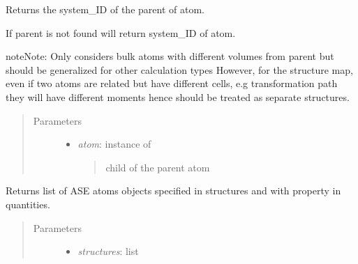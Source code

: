 \documentclass[letterpaper,10pt,english]{sphinxmanual}
\begin{document}
\begin{fulllineitems}

\begin{fulllineitems}
\label{classes:catdata.CATData.get_parent}
Returns the system\_ID of the parent of atom.

If parent is not found will return system\_ID of atom.

\begin{notice}{note}{Note:}
Only considers bulk atoms with different volumes from parent 
but should be generalized for other calculation types
However, for the structure map, even if two atoms are related
but have different cells, e.g transformation path they will
have different moments hence should be treated as separate
structures.
\end{notice}
\begin{quote}\begin{description}
\item[{Parameters}] \leavevmode\begin{itemize}
\item {} 
\emph{atom}: instance of 
\begin{quote}

child of the parent atom
\end{quote}

\end{itemize}

\end{description}\end{quote}

\end{fulllineitems}


\begin{fulllineitems}
\label{classes:catdata.CATData.get_ref_atoms}
Returns list of ASE atoms objects specified in structures and with
property in quantities.
\begin{quote}\begin{description}
\item[{Parameters}] \leavevmode\begin{itemize}
\item {} 
\emph{structures}: list
\begin{quote}


\end{quote}
\end{itemize}
\end{description}
\end{quote}
\end{fulllineitems}
\end{fulllineitems}
\end{document}
